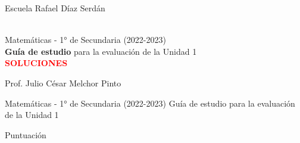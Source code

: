 \pagestyle{headandfoot}
\extraheadheight[32mm]{5mm}
\firstpageheader
{}
{\vspace{40mm}
\begin{LARGE} \color{colorrds} Escuela Rafael D\'iaz Serd\'an
\end{LARGE}\LOGO\\
{\large Matem\'aticas - 1° de Secundaria (2022-2023)}\\
\textbf{Guía de estudio} para la evaluación de la Unidad 1\\
{\ifprintanswers
  \textcolor{red}{\textbf{SOLUCIONES}}\\
\fi
}
\begin{footnotesize}Prof. Julio C\'esar Melchor Pinto\end{footnotesize}}
{}
\runningheader
{Matem\'aticas - 1° de Secundaria (2022-2023)}
{}
{Guía de estudio para la evaluación de la Unidad 1}
\runningheadrule
\thispagestyle{headandfoot}
\begin{center}

  \footnotesize

  \begin{mybox}{0.60\linewidth}{
      \begin{comfortaa}
        \color{white}Puntuaci\'on
      \end{comfortaa}}
    \cellwidth{0.2em}
    \gradetable[h][questions]
  \end{mybox}
\end{center}
